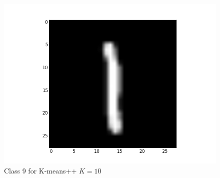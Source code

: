 \documentclass[submit]{harvardml}
\begin{document}
\begin{figure}[ht]
    \includegraphics[scale=0.20]{K10-representative-8-2}
    \caption{Class 9 for K-means++ $K=10$}
\end{figure}
\end{document}
